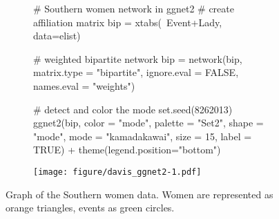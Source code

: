 \begin{figure}[bh]
\begin{subfigure}[t]{\textwidth}
\caption{}


             \begin{adjustbox}{valign=t}

             \begin{minipage}{.49\textwidth}
{\footnotesize              
\begin{example}
# Southern women network in ggnet2
# create affiliation matrix
bip = xtabs(~Event+Lady, data=elist)

# weighted bipartite network
bip = network(bip,
              matrix.type = "bipartite",
              ignore.eval = FALSE,
              names.eval = "weights")

# detect and color the mode
set.seed(8262013)
ggnet2(bip, color = "mode", palette = "Set2", 
       shape = "mode", mode = "kamadakawai",
       size = 15, label = TRUE) +
  theme(legend.position="bottom")
\end{example} 
}

                   \end{minipage}

                  \begin{minipage}{.49\textwidth}

\texttt{[image: figure/davis\_ggnet2-1.pdf]}

                          \end{minipage}

                          \end{adjustbox}
\end{subfigure}
\caption{Graph of the Southern women data. Women are represented as orange triangles, events as green circles. }
\end{figure}
